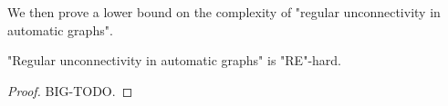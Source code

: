 We then prove a lower bound on the complexity of "regular unconnectivity in automatic graphs".

\begin{lemma}
	\AP\label{lemma:regular-unconnectivity-lowerbound}
	"Regular unconnectivity in automatic graphs" is "RE"-hard.
\end{lemma}

\begin{proof}
	BIG-TODO.


\end{proof}
